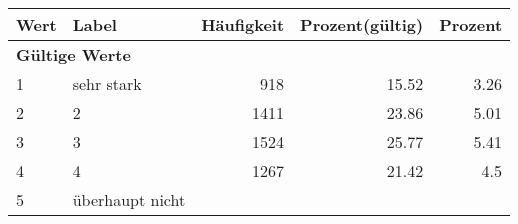      \begin{longtable}{lXrrr}
     \toprule
     \textbf{Wert} & \textbf{Label} & \textbf{Häufigkeit} & \textbf{Prozent(gültig)} & \textbf{Prozent} \\
     \endhead
     \midrule
     \multicolumn{5}{l}{\textbf{Gültige Werte}}\\

     1 &
     \multicolumn{1}{X}{ sehr stark   } &


       \num{918} &
       \num[round-mode=places,round-precision=2]{15,52} &
         \num[round-mode=places,round-precision=2]{3,26} \\

     2 &
     \multicolumn{1}{X}{ 2   } &


       \num{1411} &
       \num[round-mode=places,round-precision=2]{23,86} &
         \num[round-mode=places,round-precision=2]{5,01} \\

     3 &
     \multicolumn{1}{X}{ 3   } &


       \num{1524} &
       \num[round-mode=places,round-precision=2]{25,77} &
         \num[round-mode=places,round-precision=2]{5,41} \\

     4 &
     \multicolumn{1}{X}{ 4   } &


       \num{1267} &
       \num[round-mode=places,round-precision=2]{21,42} &
         \num[round-mode=places,round-precision=2]{4,5} \\

     5 &
     \multicolumn{1}{X}{ überhaupt nicht   } &



\end{longtable}
